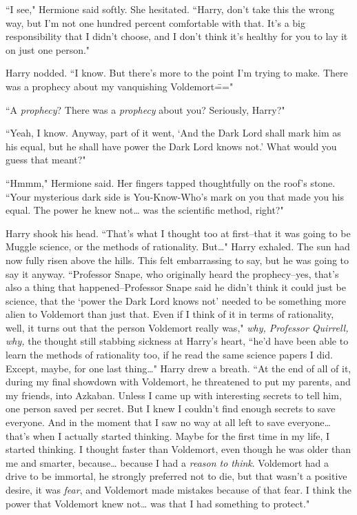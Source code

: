 ``I see," Hermione said softly. She hesitated. ``Harry, don't take this the wrong way, but I'm not one hundred percent comfortable with that. It's a big responsibility that I didn't choose, and I don't think it's healthy for you to lay it on just one person."

Harry nodded. ``I know. But there's more to the point I'm trying to make. There was a prophecy about my vanquishing Voldemort\==="

``A \emph{prophecy}? There was a \emph{prophecy} about you? Seriously, Harry?"

``Yeah, I know. Anyway, part of it went, `And the Dark Lord shall mark him as his equal, but he shall have power the Dark Lord knows not.' What would you guess that meant?"

``Hmmm," Hermione said. Her fingers tapped thoughtfully on the roof's stone. ``Your mysterious dark side is You-Know-Who's mark on you that made you his equal. The power he knew not{\ldots} was the scientific method, right?"

Harry shook his head. ``That's what I thought too at first\---that it was going to be Muggle science, or the methods of rationality. But{\ldots}" Harry exhaled. The sun had now fully risen above the hills. This felt embarrassing to say, but he was going to say it anyway. ``Professor Snape, who originally heard the prophecy\---yes, that's also a thing that happened\---Professor Snape said he didn't think it could just be science, that the `power the Dark Lord knows not' needed to be something more alien to Voldemort than just that. Even if I think of it in terms of rationality, well, it turns out that the person Voldemort really was," \emph{why, Professor Quirrell, why,} the thought still stabbing sickness at Harry's heart, ``he'd have been able to learn the methods of rationality too, if he read the same science papers I did. Except, maybe, for one last thing{\ldots}" Harry drew a breath. ``At the end of all of it, during my final showdown with Voldemort, he threatened to put my parents, and my friends, into Azkaban. Unless I came up with interesting secrets to tell him, one person saved per secret. But I knew I couldn't find enough secrets to save everyone. And in the moment that I saw no way at all left to save everyone{\ldots} that's when I actually started thinking. Maybe for the first time in my life, I started thinking. I thought faster than Voldemort, even though he was older than me and smarter, because{\ldots} because I had a \emph{reason to think}. Voldemort had a drive to be immortal, he strongly preferred not to die, but that wasn't a positive desire, it was \emph{fear}, and Voldemort made mistakes because of that fear. I think the power that Voldemort knew not{\ldots} was that I had something to protect."

